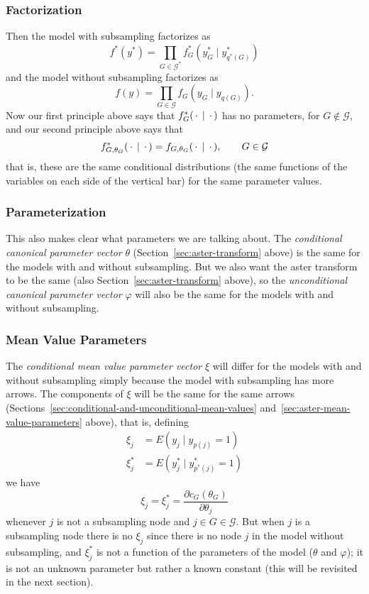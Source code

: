 \subsubsection{Factorization}

Then the model with subsampling factorizes as
\begin{equation} \label{eq:factorization-with}
   f^*(y^*) = \prod_{G \in \mathcal{G}^*} f^*_G(y^*_G \mid y^*_{q^*(G)})
\end{equation}
and the model without subsampling factorizes as
\begin{equation} \label{eq:factorization-without}
   f(y) = \prod_{G \in \mathcal{G}} f_G(y_G \mid y_{q(G)}).
\end{equation}
Now our first principle above says that
$f^*_G(\,\cdot\, \mid \,\cdot\,)$ has no parameters,
for $G \notin \mathcal{G}$,
and our second principle above says that
$$
   f^*_{G, \theta_G}(\,\cdot\, \mid \,\cdot\,)
   =
   f_{G, \theta_G}(\,\cdot\, \mid \,\cdot\,),
   \qquad
   G \in \mathcal{G}
$$
that is, these are the same conditional distributions (the same functions
of the variables on each side of the vertical bar) for the same parameter
values.

\subsubsection{Parameterization}

This also makes clear what parameters we are talking about.
The \emph{conditional canonical parameter vector} $\theta$
(Section~\ref{sec:aster-transform} above)
is the same for the models with and without subsampling.
But we also want the aster transform to be the same
(also Section~\ref{sec:aster-transform} above), so
the \emph{unconditional canonical parameter vector} $\varphi$ will also be
the same for the models with and without subsampling.

\subsubsection{Mean Value Parameters}

The \emph{conditional mean value parameter vector} $\xi$ will differ
for the models with and without subsampling simply because the model
with subsampling has more arrows.  The components of $\xi$ will be the
same for the same arrows
(Sections~\ref{sec:conditional-and-unconditional-mean-values}
and~\ref{sec:aster-mean-value-parameters} above), that is, defining
\begin{align*}
   \xi_j & = E(y_j \mid y_{p(j)} = 1)
   \\
   \xi^*_j & = E(y_j^* \mid y^*_{p^*(j)} = 1)
\end{align*}
we have
$$
   \xi_j = \xi^*_j = \frac{\partial c_G(\theta_G)}{\partial \theta_j}
$$
whenever $j$ is not a subsampling node and $j \in G \in \mathcal{G}$.
But when $j$ is a subsampling node there is no $\xi_j$ since there is
no node $j$ in the model without subsampling, and $\xi^*_j$ is not a function
of the parameters of the model ($\theta$ and $\varphi$); it is not an unknown
parameter but rather a known constant (this will be revisited in the
next section).

